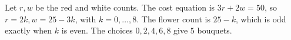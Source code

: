 Let $r,w$ be the red and white counts. The cost equation is $3r+2w=50$, so $r=2k,w=25-3k$, with $k=0,\ldots,8$. The flower count is $25-k$, which is odd exactly when $k$ is even. The choices $0,2,4,6,8$ give $\boxed5$ bouquets.
